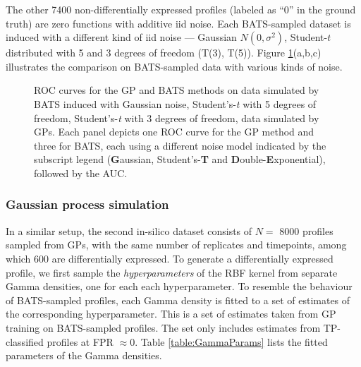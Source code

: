 	The other 7400 non-differentially expressed profiles (labeled as ``0'' in
	the ground truth) are zero functions with additive iid noise.
	Each BATS-sampled dataset is induced with a different kind of iid
	noise --- Gaussian $N(0,\sigma^2)$, Student-$t$ distributed with
	5 and 3 degrees of freedom (T(3), T(5)).
	Figure \ref{fig:GPvsBATSonBATSdata}(a,b,c)
	illustrates the comparison on BATS-sampled data with various kinds of noise.

	\begin{figure}[!htbp]
	  \centering
	  \caption[GP vs. BATS on simulated data.] {
	    ROC curves for the GP and BATS methods on data simulated by BATS
	    induced with \textbf{} Gaussian
	    noise, \textbf{} Student's-\textit{t} with
	    5 degrees of freedom, \textbf{}
	    Student's-\textit{t} with 3 degrees of freedom,
	    \textbf{} data simulated by GPs.
	    Each panel depicts one ROC curve for the GP method and three for BATS, each
	    using a different noise model indicated by the subscript
	    legend (\textbf{G}aussian, Student's-\textbf{T} and
	    \textbf{D}ouble-\textbf{E}xponential), followed by the AUC.
	  } \label{fig:GPvsBATSonBATSdata}
	\end{figure}
   
      \subsubsection{Gaussian process simulation}
	In a similar setup, the second in-silico dataset consists of $N=$ 8000 profiles
	sampled from GPs, with the same number of replicates and timepoints,
	among which 600 are differentially expressed. To generate a differentially expressed profile,
	we first sample the \textit{hyperparameters} of the RBF kernel from
	separate Gamma densities, one for each each hyperparameter.
	To resemble the behaviour of BATS-sampled profiles, each Gamma
	density is fitted to a set of estimates of the corresponding
	hyperparameter. This is a set of estimates taken from GP training on BATS-sampled profiles.
	The set only includes estimates from TP-classified profiles at FPR $\approx 0$.
	Table \ref{table:GammaParams} lists the fitted parameters of the Gamma densities.

